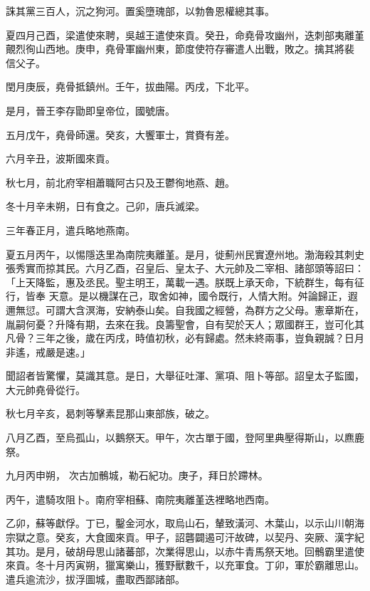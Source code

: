 \begin{pinyinscope}
 誅其黨三百人，沉之狗河。置奚墮瑰部，以勃魯恩權總其事。



 夏四月己酉，梁遣使來聘，吳越王遣使來貢。癸丑，命堯骨攻幽州，迭刺部夷離堇覿烈徇山西地。庚申，堯骨軍幽州東，節度使符存審遣人出戰，敗之。擒其將裴
 信父子。



 閏月庚辰，堯骨抵鎮州。壬午，拔曲陽。丙戌，下北平。



 是月，晉王李存勖即皇帝位，國號唐。



 五月戊午，堯骨師還。癸亥，大饗軍士，賞賚有差。



 六月辛丑，波斯國來貢。



 秋七月，前北府宰相蕭職阿古只及王鬱徇地燕、趙。



 冬十月辛未朔，日有食之。己卯，唐兵滅梁。



 三年春正月，遣兵略地燕南。



 夏五月丙午，以惕隱迭里為南院夷離堇。是月，徙薊州民實遼州地。渤海殺其刺史張秀實而掠其民。六月乙酉，召皇后、皇太子、大元帥及二宰相、諸部頭等詔曰：「上天降監，惠及丞民。聖主明王，萬載一遇。朕既上承天命，下統群生，每有征行，皆奉
 天意。是以機謀在己，取舍如神，國令既行，人情大附。舛論歸正，遐邇無愆。可謂大含溟海，安納泰山矣。自我國之經營，為群方之父母。憲章斯在，胤嗣何憂？升降有期，去來在我。良籌聖會，自有契於天人；眾國群王，豈可化其凡骨？三年之後，歲在丙戌，時值初秋，必有歸處。然未終兩事，豈負親誠？日月非遙，戒嚴是速。」



 聞詔者皆驚懼，莫識其意。是日，大舉征吐渾、黨項、阻卜等部。詔皇太子監國，大元帥堯骨從行。



 秋七月辛亥，曷刺等擊素昆那山東部族，破之。



 八月乙酉，至烏孤山，以鵝祭天。甲午，次古單于國，登阿里典壓得斯山，以麃鹿祭。



 九月丙申朔，
 次古加鶻城，勒石紀功。庚子，拜日於蹛林。



 丙午，遣騎攻阻卜。南府宰相蘇、南院夷離堇迭裡略地西南。



 乙卯，蘇等獻俘。丁已，鑿金河水，取烏山石，輦致潢河、木葉山，以示山川朝海宗獄之意。癸亥，大食國來貢。甲子，詔礱闢遏可汗故碑，以契丹、突厥、漢字紀其功。是月，破胡母思山諸蕃部，次業得思山，以赤牛青馬祭天地。回鶻霸里遣使來貢。冬十月丙寅朔，獵寓樂山，獲野獸數千，以充軍食。丁卯，軍於霸離思山。遣兵逾流沙，拔浮圖城，盡取西鄙諸部。




\end{pinyinscope}
